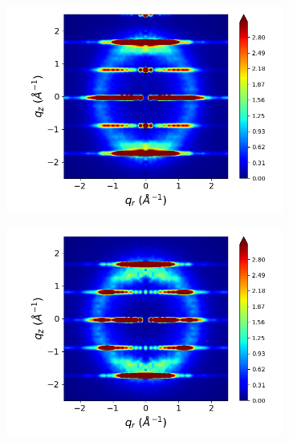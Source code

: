 \documentclass[journal=jpcbfk,manusciprt=article]{achemso}
\begin{document}
\begin{figure}[htb]
\begin{subfigure}{0.3\linewidth}
  	\label{fig:rotated_carboxylate_rzplot_restrained}
  \end{subfigure}
  \begin{subfigure}{0.3\linewidth}
  	\centering
  	\includegraphics[width=\textwidth]{staggered_rzplot_restrained.png}
  	\label{fig:staggered_rzplot_restrained}
  \end{subfigure}
  \begin{subfigure}{0.3\linewidth}
  	\centering
  	\includegraphics[width=\textwidth]{rotated_monomers_rzplot_restrained.png}
  	\label{fig:rotated_monomers_rzplot_restrained}
  \end{subfigure}
  \begin{subfigure}{0.3\linewidth}
  	\centering

\end{subfigure}
\end{figure}
\end{document}
